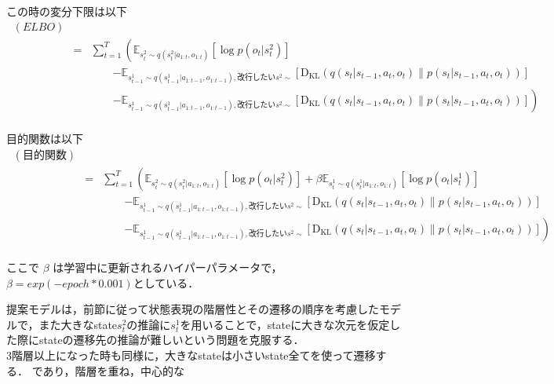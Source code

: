 この時の変分下限は以下
\begin{eqnarray}
  \ (ELBO) \nonumber \\
  &=& \sum_{t=1}^T \left( \mathbb{E}_{s^2_t \sim q(s^2_t|a_{1:t}, o_{1:t})} [\log p(o_t|s^2_t)] \right. \nonumber \\
  && \hspace{2em} \left. - \mathbb{E}_{s^1_{t-1} \sim q(s^1_{t-1}|a_{1:t-1}, o_{1:t-1}), 改行したい s^2 \sim}  [\mathrm{D_{KL}}(q(s_t|s_{t-1}, a_t, o_t) \| p(s_t|s_{t-1}, a_t, o_t))] \right. \nonumber \\
  && \hspace{2em} \left. - \mathbb{E}_{s^1_{t-1} \sim q(s^1_{t-1}|a_{1:t-1}, o_{1:t-1}), 改行したい s^2 \sim } [\mathrm{D_{KL}}(q(s_t|s_{t-1}, a_t, o_t) \| p(s_t|s_{t-1}, a_t, o_t))] \right) \nonumber \\
  \label{eq:hssm_elbo}
\end{eqnarray}


目的関数は以下
% 
\begin{eqnarray}
  \ (目的関数) \nonumber \\
  &=& \sum_{t=1}^T \left( \mathbb{E}_{s^2_t \sim q(s^2_t|a_{1:t}, o_{1:t})} [\log p(o_t|s^2_t)] + \beta \mathbb{E}_{s^1_t \sim q(s^1_t|a_{1:t}, o_{1:t})} [\log p(o_t|s^1_t)] \right. \nonumber \\
  && \hspace{2em} \left. - \mathbb{E}_{s^1_{t-1} \sim q(s^1_{t-1}|a_{1:t-1}, o_{1:t-1}), 改行したい s^2 \sim}  [\mathrm{D_{KL}}(q(s_t|s_{t-1}, a_t, o_t) \| p(s_t|s_{t-1}, a_t, o_t))] \right. \nonumber \\
  && \hspace{2em} \left. - \mathbb{E}_{s^1_{t-1} \sim q(s^1_{t-1}|a_{1:t-1}, o_{1:t-1}), 改行したい s^2 \sim } [\mathrm{D_{KL}}(q(s_t|s_{t-1}, a_t, o_t) \| p(s_t|s_{t-1}, a_t, o_t))] \right) \nonumber \\
  \label{eq:hssm_loss}
\end{eqnarray}

ここで $\beta$ は学習中に更新されるハイパーパラメータで， $\beta = exp(-epoch*0.001)$としている．

提案モデルは，前節に従って状態表現の階層性とその遷移の順序を考慮したモデルで，また大きなstate$s^2_t$の推論に$s^1_t$を用いることで，stateに大きな次元を仮定した際にstateの遷移先の推論が難しいという問題を克服する． \\

3階層以上になった時も同様に，大きなstateは小さいstate全てを使って遷移する．
であり，階層を重ね，中心的な

